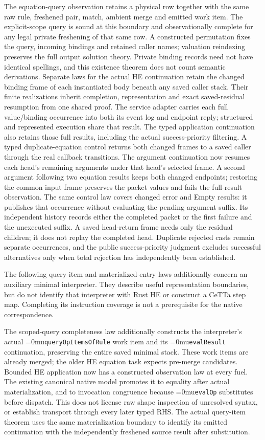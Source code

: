 \documentclass[11pt,a4paper]{article}
\newcommand{\name}[1]{\textup{\Urlmuskip=0mu\relax\nolinkurl{#1}}}
\begin{document}
The equation-query observation retains a physical row together with the same
raw rule, freshened pair, match, ambient merge and emitted work item.
The explicit-scope query is sound at this boundary and observationally complete
for any legal private freshening of that same row. A constructed permutation
fixes the query, incoming bindings and retained caller names; valuation
reindexing preserves the full output solution theory. Private binding records
need not have identical spellings, and this existence theorem does not count
semantic derivations. Separate laws for the actual HE continuation retain
the changed binding frame of each instantiated body beneath any saved caller
stack. Their finite realizations inherit completion, representation and exact
saved-residual resumption from one shared proof. The service adapter carries
each full value/binding occurrence into both its event log and endpoint reply;
structured and represented execution share that result. The typed application
continuation also retains those full results, including the actual
success-priority filtering. A typed duplicate-equation control returns both
changed frames to a saved caller through the real callback transitions.
The argument continuation now resumes each head's remaining arguments under
that head's selected frame. A second argument following two equation results
keeps both changed endpoints; restoring the common input frame preserves the
packet values and fails the full-result observation.
The same control law covers changed error and Empty results: it publishes
that occurrence without evaluating the pending argument suffix. Its independent
history records either the completed packet or the first failure and the
unexecuted suffix. A saved head-return frame needs only the residual children;
it does not replay the completed head. Duplicate rejected casts remain separate
occurrences, and the public success-priority judgment excludes successful
alternatives only when total rejection has independently been established.

The following query-item and materialized-entry laws additionally concern an
auxiliary minimal interpreter. They describe useful representation boundaries,
but do not identify that interpreter with Rust HE or construct a CeTTa step
map. Completing its instruction coverage is not a prerequisite for the native
correspondence.

The scoped-query completeness law additionally constructs the interpreter's
actual \name{queryOpItemsOfRule} work item and its \name{evalResult}
continuation, preserving the entire saved minimal stack. These work items
are already merged; the older HE equation task expects pre-merge candidates.
Bounded HE application now has a constructed observation law at every fuel.
The existing canonical native model promotes it to equality after actual
materialization, and to invocation congruence because \name{evalOp}
substitutes before dispatch. This does not license raw shape inspection of
unresolved syntax, or establish transport through every later typed RHS.
The actual query-item theorem uses the same materialization boundary to
identify its emitted continuation with the independently freshened source
result after substitution.
\end{document}
